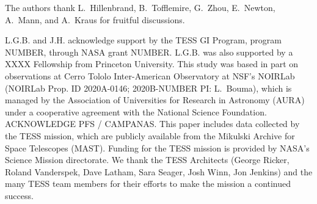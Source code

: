 \documentclass[12pt,twocolumn,tighten]{aastex63}
\begin{document}


\acknowledgements
\raggedbottom

The authors thank L.~Hillenbrand, B.~Tofflemire, G.~Zhou, E.~Newton, A.~Mann, and A.~Kraus for fruitful discussions.

%
L.G.B. and J.H. acknowledge support by the TESS GI Program, program
NUMBER, through NASA grant NUMBER.
L.G.B. was also supported by a XXXX Fellowship from Princeton
University.
%
This study was based in part on observations at Cerro Tololo
Inter-American Observatory at NSF's NOIRLab (NOIRLab Prop. ID
2020A-0146; 2020B-NUMBER PI: L{.}~Bouma), which is managed by the
Association of Universities for Research in Astronomy (AURA) under a
cooperative agreement with the National Science Foundation.
%
ACKNOWLEDGE PFS / CAMPANAS.
%
This paper includes data collected by the TESS mission, which are
publicly available from the Mikulski Archive for Space Telescopes
(MAST).
%
Funding for the TESS mission is provided by NASA's Science Mission
directorate.
%
We thank the TESS Architects (George Ricker, Roland Vanderspek, Dave
Latham, Sara Seager, Josh Winn, Jon Jenkins) and the many TESS team
members for their efforts to make the mission a continued success.
%

%
%


%
\end{document}
